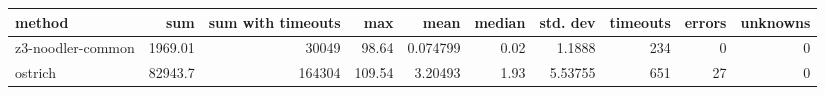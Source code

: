\begin{tabular}{lrrrrrrrrr}
\hline
 method            &      sum &   sum with timeouts &    max &     mean &   median &   std. dev &   timeouts &   errors &   unknowns \\
\hline
 z3-noodler-common &  1969.01 &               30049 &  98.64 & 0.074799 &     0.02 &    1.1888  &        234 &        0 &          0 \\
 ostrich           & 82943.7  &              164304 & 109.54 & 3.20493  &     1.93 &    5.53755 &        651 &       27 &          0 \\
\hline
\end{tabular}
